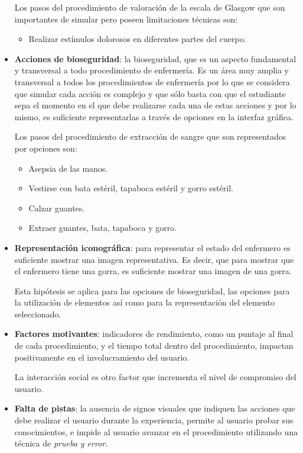 \begin{itemize}
    Los pasos del procedimiento de valoración de la escala de Glasgow que son
    importantes de simular pero poseen limitaciones técnicas son:
    \begin{itemize} 
    \item Realizar estímulos dolorosos en diferentes partes del cuerpo. 
    \end{itemize}
    
\item 
    \textbf{Acciones de bioseguridad}: la bioseguridad, que es un aspecto
    fundamental y transversal a todo procedimiento de enfermería. Es un área muy
    amplia y transversal a todos los procedimientos de enfermería por lo que se
    considera que simular cada acción es complejo y que sólo basta con que el
    estudiante sepa el momento en el que debe realizarse cada una de estas
    acciones y por lo mismo, es suficiente representarlas a través de opciones
    en la interfaz gráfica.

    
    Los pasos del procedimiento de extracción de sangre que son representados
    por opciones son:
    \begin{itemize}
        \item Asepsia de las manos.
        \item Vestirse con bata estéril, tapaboca estéril y gorro estéril.
        \item Calzar guantes.
        \item Extraer guantes, bata, tapaboca y gorro.
    \end{itemize}
    
\item
    \textbf{Representación iconográfica}: para representar el estado del
    enfermero es suficiente mostrar una imagen representativa. Es decir, que
    para mostrar que el enfermero tiene una gorra, es suficiente mostrar una
    imagen de una gorra.
    
    Esta hipótesis se aplica para las opciones de bioseguridad, las opciones
    para la utilización de elementos así como para la representación del
    elemento seleccionado.
\item 
    \textbf{Factores motivantes}: indicadores de rendimiento, como un puntaje al
    final de cada procedimiento, y el tiempo total dentro del procedimiento,
    impactan positivamente en el involucramiento del usuario.

    La interacción social es otro factor que incrementa el nivel de compromiso
    del usuario.

\item 
    \textbf{Falta de pistas}: la ausencia de signos visuales que indiquen las
    acciones que debe realizar el usuario durante la experiencia, permite al
    usuario probar sus conocimientos, e impide al usuario avanzar en el
    procedimiento utilizando una técnica de \emph{prueba y error}.

\end{itemize}

